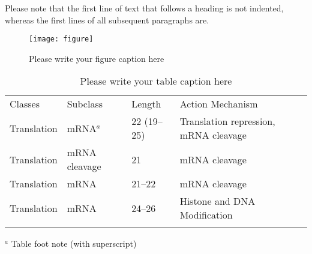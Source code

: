 Please note that the first line of text that follows a heading is not indented, whereas the first lines of all subsequent paragraphs are.

%
\begin{figure}[t]
\sidecaption[t]
\texttt{[image: figure]}
%
%
\caption{Please write your figure caption here}
\label{fig:A1}       %
\end{figure}

%
\begin{table}
\caption{Please write your table caption here}
\label{tab:A1}       %
%
%
\begin{tabular}{p{2cm}p{2.4cm}p{2cm}p{4.9cm}}
\hline\noalign{\smallskip}
Classes & Subclass & Length & Action Mechanism  \\
\noalign{\smallskip}\hline\noalign{\smallskip}
Translation & mRNA$^a$  & 22 (19--25) & Translation repression, mRNA cleavage\\
Translation & mRNA cleavage & 21 & mRNA cleavage\\
Translation & mRNA  & 21--22 & mRNA cleavage\\
Translation & mRNA  & 24--26 & Histone and DNA Modification\\
\noalign{\smallskip}\hline\noalign{\smallskip}
\end{tabular}
$^a$ Table foot note (with superscript)
\end{table}
%
